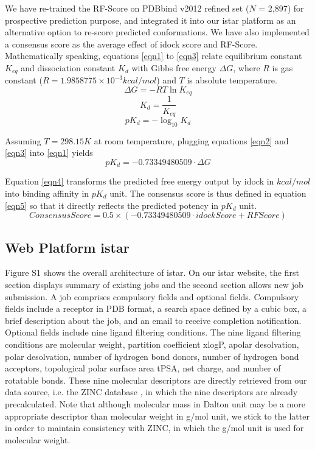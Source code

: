 \documentclass[10pt]{article}
\begin{document}
We have re-trained the RF-Score on PDBbind v2012 refined set ($N$ = 2,897) for prospective prediction purpose, and integrated it into our istar platform as an alternative option to re-score predicted conformations. We have also implemented a consensus score as the average effect of idock score and RF-Score. Mathematically speaking, equations \eqref{eqn1} to \eqref{eqn3} relate equilibrium constant $K_{eq}$ and dissociation constant $K_d$ with Gibbs free energy $\Delta G$, where $R$ is gas constant ($R = 1.9858775 \times 10^{-3} kcal/mol$) and $T$ is absolute temperature.
\begin{equation}
\label{eqn1}
\Delta G = -RT\ln K_{eq}
\end{equation}
\begin{equation}
\label{eqn2}
K_d = \frac{1}{K_{eq}}
\end{equation}
\begin{equation}
\label{eqn3}
pK_d = -\log_{10} K_d
\end{equation}

Assuming $T = 298.15K$ at room temperature, plugging equations \eqref{eqn2} and \eqref{eqn3} into \eqref{eqn1} yields
\begin{equation}
\label{eqn4}
pK_d = -0.73349480509 \cdot \Delta G
\end{equation}

Equation \eqref{eqn4} transforms the predicted free energy output by idock in $kcal/mol$ into binding affinity in $pK_d$ unit. The consensus score is thus defined in equation \eqref{eqn5} so that it directly reflects the predicted potency in $pK_d$ unit.
\begin{equation}
\label{eqn5}
ConsensusScore = 0.5 \times (-0.73349480509 \cdot idockScore + RFScore)
\end{equation}

\subsection*{Web Platform istar}
Figure S1 shows the overall architecture of istar. On our istar website, the first section displays summary of existing jobs and the second section allows new job submission. A job comprises compulsory fields and optional fields. Compulsory fields include a receptor in PDB format, a search space defined by a cubic box, a brief description about the job, and an email to receive completion notification. Optional fields include nine ligand filtering conditions. The nine ligand filtering conditions are molecular weight, partition coefficient xlogP, apolar desolvation, polar desolvation, number of hydrogen bond donors, number of hydrogen bond acceptors, topological polar surface area tPSA, net charge, and number of rotatable bonds. These nine molecular descriptors are directly retrieved from our data source, i.e. the ZINC database \cite{532,1178}, in which the nine descriptors are already precalculated. Note that although molecular mass in Dalton unit may be a more appropriate descriptor than molecular weight in g/mol unit, we stick to the latter in order to maintain consistency with ZINC, in which the g/mol unit is used for molecular weight.
\end{document}

